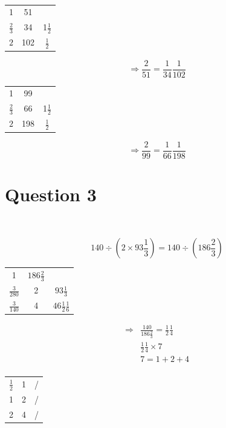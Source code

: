 \documentclass{article}
\begin{document}
~

\begin{center}
\begin{tabular}{ccc}
    1& 51& \\
    $\frac{2}{3}$&34&1$\frac{1}{2}$\\
    $2$&102&$\frac{1}{2}$\\
\end{tabular}
\end{center}
\[\Rightarrow \frac{2}{51}=\frac{1}{34}\frac{1}{102}
\]

\begin{center}
\begin{tabular}{ccc}
    1& 99& \\
    $\frac{2}{3}$&66&1$\frac{1}{2}$\\
    $2$&198&$\frac{1}{2}$\\
\end{tabular}
\end{center}
\[\Rightarrow \frac{2}{99}=\frac{1}{66}\frac{1}{198}
\]

\newpage

\section*{Question 3}

~

\[ 140\div(2\times 93\frac{1}{3})=140\div(186\frac{2}{3})
\]

\begin{center}
    \begin{tabular}{ccc}
        1 & $186\frac{2}{3}$&\\
        $\frac{3}{280}$ & 2&$93\frac{1}{3}$\\
        $\frac{3}{140}$&4&$46\frac{1}{2}\frac{1}{6}$\\
    \end{tabular}
\end{center}

\begin{align*}
    \Rightarrow&\frac{140}{186\frac{2}{3}}=\frac{1}{2}\frac{1}{4}\\
    &\frac{1}{2}\frac{1}{4}\times7\\
    &7=1+2+4\\
\end{align*}

\begin{center}
    \begin{tabular}{ccc}
        $\frac{1}{2}$&1&/  \\
        1&2&/\\
        2&4&/\\
    \end{tabular}
\end{center}
\end{document}
